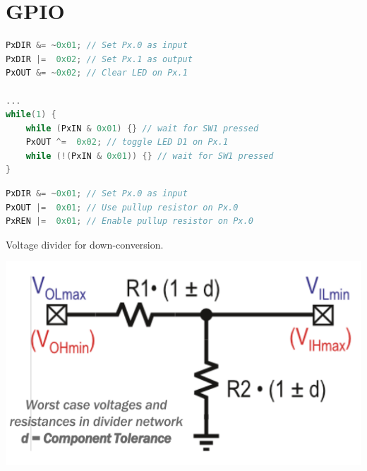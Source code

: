 \section{GPIO }
\begin{lstlisting}[language=C++]
PxDIR &= ~0x01;	// Set Px.0 as input
PxDIR |=  0x02;	// Set Px.1 as output
PxOUT &= ~0x02;	// Clear LED on Px.1

...
while(1) {
	while (PxIN & 0x01) {} // wait for SW1 pressed
	PxOUT ^=  0x02; // toggle LED D1 on Px.1
	while (!(PxIN & 0x01)) {} // wait for SW1 pressed
}
\end{lstlisting}\vspace{-25px}
\begin{lstlisting}[language=C++]
PxDIR &= ~0x01;	// Set Px.0 as input
PxOUT |=  0x01;	// Use pullup resistor on Px.0
PxREN |=  0x01; // Enable pullup resistor on Px.0
\end{lstlisting}\vspace{-20px}

Voltage divider for down-conversion.
\begin{center}
	\includegraphics[width=.6\columnwidth]{"Images/Voltage_Divider.png"}
\end{center}







